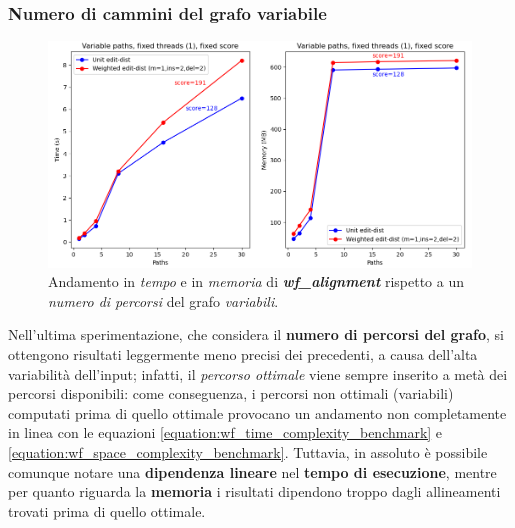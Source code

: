 \clearpage
\subsubsection{Numero di cammini del grafo variabile}
    \begin{figure}[h]
        \centering
        \includegraphics[width=1.0\linewidth]{images/benchmark_paths_variable.png} 
         \caption[Andamento con percorsi variabili]{Andamento in \emph{tempo} e in \emph{memoria} di \textbf{\textit{wf\_alignment}} rispetto a un \emph{numero di percorsi} del grafo \emph{variabili}.}
        \label{fig:benchmark_paths}
    \end{figure}
    \vspace{20pt}
    
    Nell'ultima sperimentazione, che considera il \textbf{numero di percorsi del grafo}, si ottengono risultati leggermente meno precisi dei precedenti, a causa dell'alta variabilità dell'input; infatti, il \emph{percorso ottimale} viene sempre inserito a metà dei percorsi disponibili: come conseguenza, i percorsi non ottimali (variabili) computati prima di quello ottimale provocano un andamento non completamente in linea con le equazioni \ref{equation:wf_time_complexity_benchmark} e \ref{equation:wf_space_complexity_benchmark}. Tuttavia, in assoluto è possibile comunque notare una \textbf{dipendenza lineare} nel \textbf{tempo di esecuzione}, mentre per quanto riguarda la \textbf{memoria} i risultati dipendono troppo dagli allineamenti trovati prima di quello ottimale.   

